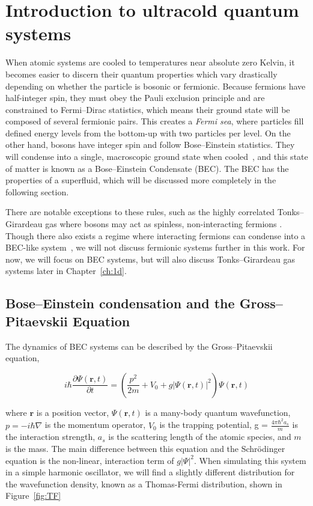 \section{Introduction to ultracold quantum systems}
\label{sec:intro}

When atomic systems are cooled to temperatures near absolute zero Kelvin, it becomes easier to discern their quantum properties which vary drastically depending on whether the particle is bosonic or fermionic.
Because fermions have half-integer spin, they must obey the Pauli exclusion principle and are constrained to Fermi--Dirac statistics, which means their ground state will be composed of several fermionic pairs.
This creates a \textit{Fermi sea}, where particles fill defined energy levels from the bottom-up with two particles per level.
On the other hand, bosons have integer spin and follow Bose--Einstein statistics.
They will condense into a single, macroscopic ground state when cooled~\cite{einstein1925, fetter2003}, and
this state of matter is known as a Bose--Einstein Condensate (BEC).
The BEC has the properties of a superfluid, which will be discussed more completely in the following section.

There are notable exceptions to these rules, such as the highly correlated Tonks--Girardeau gas where bosons may act as spinless, non-interacting fermions \cite{girardeau1960, schloss2016}.
Though there also exists a regime where interacting fermions can condense into a BEC-like system~\cite{nozieres1985, bulgac2014}, we will not discuss fermionic systems further in this work.
For now, we will focus on BEC systems, but will also discuss Tonks--Girardeau gas systems later in Chapter~\ref{ch:1d}.


\subsection{Bose--Einstein condensation and the Gross--Pitaevskii Equation}

The dynamics of BEC systems can be described by the Gross--Pitaevskii equation, 

\begin{equation}
i \hbar \frac{\partial \Psi(\mathbf{r},t)}{\partial t} = \left(\frac{p^2}{2m} + V_0 + g |\Psi(\mathbf{r},t)|^2 \right)\Psi(\mathbf{r},t)
\label{eqn:GPE}
\end{equation}

\noindent where $\mathbf{r}$ is a position vector, $\Psi(\mathbf{r},t)$ is a many-body quantum wavefunction, $p = -i\hbar\nabla$ is the momentum operator, $V_0$ is the trapping potential, g = $\frac{4\pi\hbar^2 a_s}{m}$ is the interaction strength, $a_s$ is the scattering length of the atomic species, and $m$ is the mass.
The main difference between this equation and the Schr\"odinger equation is the non-linear, interaction term of $g|\Psi|^2$.
When simulating this system in a simple harmonic oscillator, we will find a slightly different distribution for the wavefunction density, known as a Thomas-Fermi distribution, shown in Figure~\ref{fig:TF}

